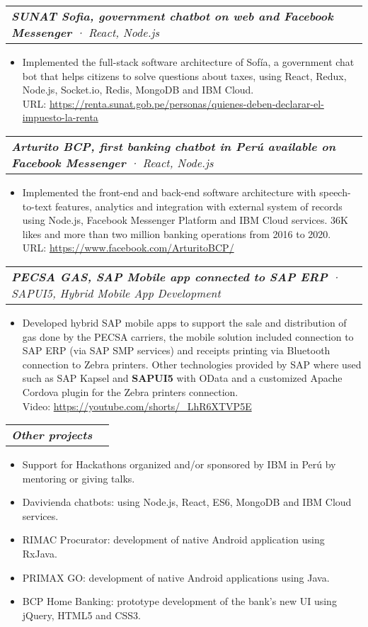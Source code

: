 \documentclass[letterpaper,11pt]{article}
\makeatletter
\newcommand{\resumeItem}[1]{
  \item\small{
    {#1 \vspace{-2pt}}
  }
}
\newcommand{\resumeSubSubheading}[2]{
    \vspace{-2pt}\item
    \begin{tabular*}{0.97\textwidth}{l@{\extracolsep{\fill}}r}
      \textit{\small#1} & \textit{\small #2} \\
    \end{tabular*}\vspace{-7pt}
}
\newcommand{\resumeItemListStart}{\begin{itemize}}
\newcommand{\resumeItemListEnd}{\end{itemize}\vspace{-5pt}}
\makeatother
\begin{document}
      \resumeSubSubheading{\textbf{SUNAT Sofia, government chatbot on web and Facebook Messenger} · React, Node.js}{}
        \resumeItemListStart
          \resumeItem{Implemented the full-stack software architecture of Sofía, a government chat bot that helps citizens to solve questions about taxes, using React, Redux, Node.js, Socket.io, Redis, MongoDB and IBM Cloud.
          \\[1.5pt] URL: {\href{https://renta.sunat.gob.pe/personas/quienes-deben-declarar-el-impuesto-la-renta}{\color{blue}https://renta.sunat.gob.pe/personas/quienes-deben-declarar-el-impuesto-la-renta}}
          }
        \resumeItemListEnd

      \resumeSubSubheading{\textbf{Arturito BCP, first banking chatbot in Perú available on Facebook Messenger} · React, Node.js}{}
        \resumeItemListStart
          \resumeItem{Implemented the front-end and back-end software architecture with speech-to-text features, analytics and integration with external system of records using Node.js, Facebook Messenger Platform and IBM Cloud services. 36K likes and more than two million banking operations from 2016 to 2020.
          \\[1.5pt] URL: {\href{https://www.facebook.com/ArturitoBCP/}{\color{blue}https://www.facebook.com/ArturitoBCP/}}
          }
        \resumeItemListEnd

      \resumeSubSubheading{\textbf{PECSA GAS, SAP Mobile app connected to SAP ERP} · SAPUI5, Hybrid Mobile App Development}{}
        \resumeItemListStart
          \resumeItem{Developed hybrid SAP mobile apps to support the sale and distribution of gas done by the PECSA carriers, the mobile solution included connection to SAP ERP (via SAP SMP services) and receipts printing via Bluetooth connection to Zebra printers. Other technologies provided by SAP where used such as SAP Kapsel and \textbf{SAPUI5} with OData and a customized Apache Cordova plugin for the Zebra printers connection.
          \\[1.5pt] Video: {\href{https://youtube.com/shorts/\_LhR6XTVP5E}{\color{blue}https://youtube.com/shorts/\_LhR6XTVP5E}}}
        \resumeItemListEnd

      \resumeSubSubheading{\textbf{Other projects} }{}
        \resumeItemListStart
          \resumeItem{Support for Hackathons organized and/or sponsored by IBM in Perú by mentoring or giving talks.}
          \resumeItem{Davivienda chatbots: using Node.js, React, ES6, MongoDB and IBM Cloud services.}
          \resumeItem{RIMAC Procurator: development of native Android application using RxJava.}
          \resumeItem{PRIMAX GO: development of native Android applications using Java.}
          \resumeItem{BCP Home Banking: prototype development of the bank's new UI using jQuery, HTML5 and CSS3.}
        \resumeItemListEnd
\end{document}
